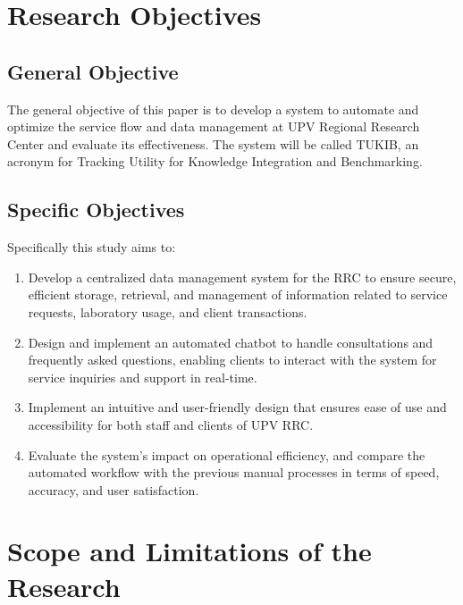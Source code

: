 \section{Research Objectives}
\label{sec:researchobjectives}

\subsection{General Objective}
\label{sec:generalobjective}

The general objective of this paper is to develop a system to automate and optimize the service flow and data management at UPV Regional Research Center and evaluate its effectiveness. The system will be called TUKIB, an acronym for Tracking Utility for Knowledge Integration and Benchmarking. 

\subsection{Specific Objectives}
\label{sec:specificobjectives}

Specifically this study aims to:

\begin{enumerate}
   
   \item Develop a centralized data management system for the RRC to ensure secure, efficient storage, retrieval, and management of information related to service requests, laboratory usage, and client transactions.
   
   \item Design and implement an automated chatbot to handle consultations and frequently asked questions, enabling clients to interact with the system for service inquiries and support in real-time.
   
   
   \item Implement an intuitive and user-friendly design that ensures ease of use and accessibility for both staff and clients of UPV RRC.
   
   \item Evaluate the system’s impact on operational efficiency, and compare the automated workflow with the previous manual processes in terms of speed, accuracy, and user satisfaction.
   
\end{enumerate}


\section{Scope and Limitations of the Research}
\label{sec:scopelimitations}

